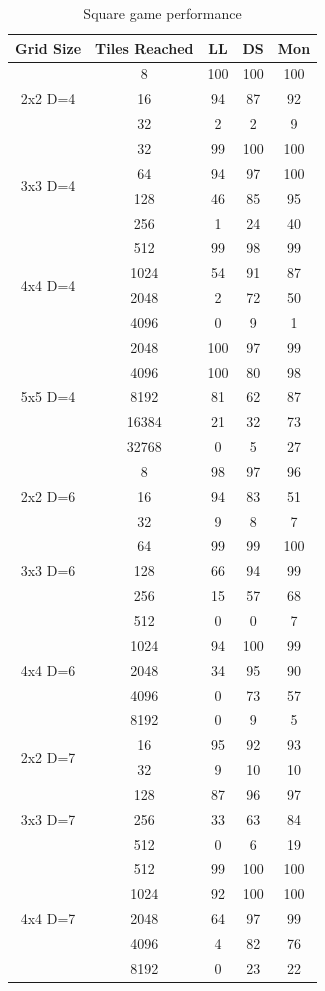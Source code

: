 \documentclass{article}
\begin{document}
\begin{table}
    \centering
    \begin{tabular}{|cc|ccc|}
    \hline
    Grid Size&Tiles Reached&LL&DS&Mon\\
    \hline
\multirow{3}{*}{2x2 D=4}&8&100&100&100\\
&16&94&87&92\\
&32&2&2&9\\
\hline
\multirow{4}{*}{3x3 D=4}&32&99&100&100\\
&64&94&97&100\\
&128&46&85&95\\
&256&1&24&40\\
\hline
\multirow{4}{*}{4x4 D=4}&512&99&98&99\\
&1024&54&91&87\\
&2048&2&72&50\\
&4096&0&9&1\\
\hline
\multirow{5}{*}{5x5 D=4}
&2048&100&97&99\\
&4096&100&80&98\\
&8192&81&62&87\\
&16384&21&32&73\\
&32768&0&5&27\\
\hline
\multirow{3}{*}{2x2 D=6}&8&98&97&96\\
&16&94&83&51\\
&32&9&8&7\\
\hline
\multirow{3}{*}{3x3 D=6}&64&99&99&100\\
&128&66&94&99\\
&256&15&57&68\\
&512&0&0&7\\
\hline
\multirow{3}{*}{4x4 D=6}&1024&94&100&99\\
&2048&34&95&90\\
&4096&0&73&57\\
&8192&0&9&5\\
\hline
\multirow{2}{*}{2x2 D=7}&16&95&92&93\\
&32&9&10&10\\
\hline
\multirow{3}{*}{3x3 D=7}&128&87&96&97\\
&256&33&63&84\\
&512&0&6&19\\
\hline
\multirow{5}{*}{4x4 D=7}&512&99&100&100\\
&1024&92&100&100\\
&2048&64&97&99\\
&4096&4&82&76\\
&8192&0&23&22\\
\hline
    \end{tabular}
    \caption{Square game performance}
    \label{tab:square}
\end{table}
\end{document}

